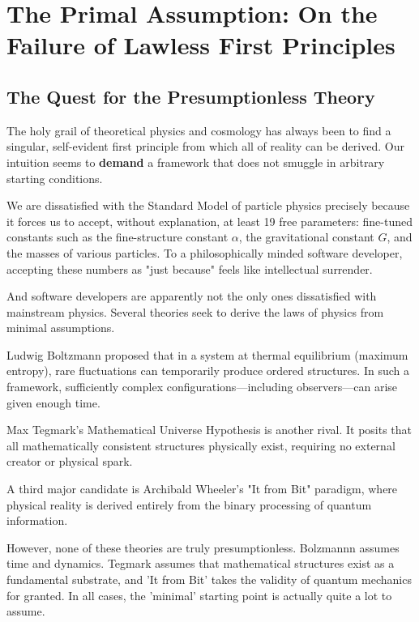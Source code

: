 \chapter{The Primal Assumption: On the Failure of Lawless First Principles}

\section{The Quest for the Presumptionless Theory}

The holy grail of theoretical physics and cosmology has always been to find a singular, self-evident first principle from which all of reality can be derived.
Our intuition seems to \textbf{demand} a framework that does not smuggle in arbitrary starting conditions.

We are dissatisfied with the Standard Model of particle physics precisely because it forces us to accept, without explanation, at least 19 free parameters: fine-tuned constants such as the fine-structure constant $\alpha$, the gravitational constant $G$, and the masses of various particles. To a philosophically minded software developer, accepting these numbers as "just because" feels like intellectual surrender.

And software developers are apparently not the only ones dissatisfied with mainstream physics. Several theories seek to derive the laws of physics from minimal assumptions.

Ludwig Boltzmann proposed that in a system at thermal equilibrium (maximum entropy), rare fluctuations can temporarily produce ordered structures. In such a framework, sufficiently complex configurations—including observers—can arise given enough time. 

Max Tegmark's Mathematical Universe Hypothesis is another rival. It posits that all mathematically consistent structures physically exist, requiring no external creator or physical spark.

A third major candidate is Archibald Wheeler's "It from Bit" paradigm, where physical reality is derived entirely from the binary processing of quantum information.

However, none of these theories are truly presumptionless. Bolzmannn assumes time and dynamics.
Tegmark assumes that mathematical structures exist as a fundamental substrate, and 'It from Bit' takes the validity of quantum mechanics for granted. In all cases, the 'minimal' starting point is actually quite a lot to assume.


